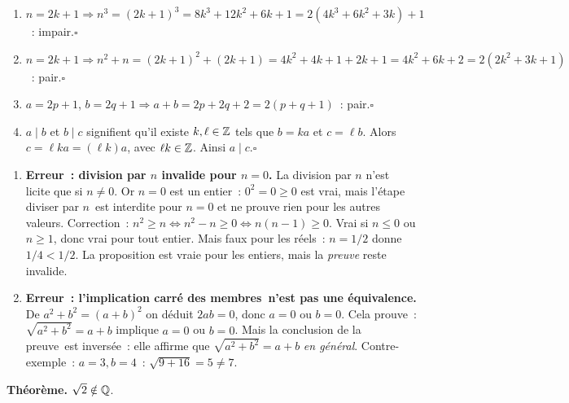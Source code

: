 
\begin{enumerate}
  \item $n=2k+1\Rightarrow n^3=(2k+1)^3=8k^3+12k^2+6k+1=2(4k^3+6k^2+3k)+1$~: impair.\hfill$\square$
  \item $n=2k+1\Rightarrow n^2+n=(2k+1)^2+(2k+1)=4k^2+4k+1+2k+1=4k^2+6k+2=2(2k^2+3k+1)$~: pair.\hfill$\square$
  \item $a=2p+1$, $b=2q+1\Rightarrow a+b=2p+2q+2=2(p+q+1)$~: pair.\hfill$\square$
  \item $a\mid b$ et $b\mid c$ signifient qu'il existe $k,\ell\in\mathbb{Z}$ tels que
        $b=ka$ et $c=\ell b$. Alors $c=\ell ka=(\ell k)a$,
        avec $\ell k\in\mathbb{Z}$. Ainsi $a\mid c$.\hfill$\square$
\end{enumerate}


\begin{enumerate}
  \item \textbf{Erreur~: division par $n$ invalide pour $n=0$.}
        La division par $n$ n'est licite que si $n\ne0$.
        Or $n=0$ est un entier~: $0^2=0\geq0$ est vrai,
        mais l'\'etape \og diviser par $n$\fg\ est interdite pour $n=0$
        et ne prouve rien pour les autres valeurs.
        Correction~: $n^2\geq n\Leftrightarrow n^2-n\geq0\Leftrightarrow n(n-1)\geq0$.
        Vrai si $n\leq0$ ou $n\geq1$, donc vrai pour tout entier.
        Mais faux pour les r\'eels~: $n=1/2$ donne $1/4<1/2$.
        La proposition est vraie pour les entiers, mais la \emph{preuve} reste invalide.
  \item \textbf{Erreur~: l'implication \og carr\'e des membres\fg\ n'est pas une \'equivalence.}
        De $a^2+b^2=(a+b)^2$ on d\'eduit $2ab=0$, donc $a=0$ ou $b=0$.
        Cela prouve~: $\sqrt{a^2+b^2}=a+b$ implique $a=0$ ou $b=0$.
        Mais la conclusion de la \og preuve\fg\ est invers\'ee~:
        elle affirme que $\sqrt{a^2+b^2}=a+b$ \emph{en g\'en\'eral}.
        Contre-exemple~: $a=3, b=4$~: $\sqrt{9+16}=5\ne7$.
\end{enumerate}


\textbf{Th\'eor\`eme.} $\sqrt{2}\notin\mathbb{Q}$.

